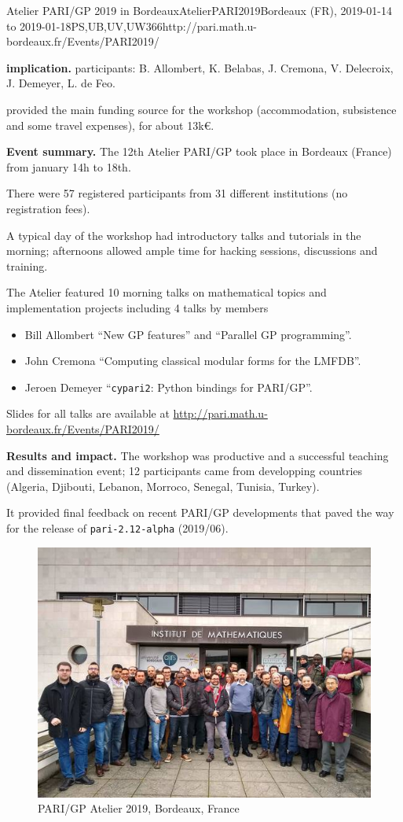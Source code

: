 \begin{event}{Atelier PARI/GP 2019 in Bordeaux}{AtelierPARI2019}{Bordeaux (FR),
2019-01-14 to 2019-01-18}{PS,UB,UV,UW}{36}{6}{http://pari.math.u-bordeaux.fr/Events/PARI2019/}


\textbf{\ODK implication.} \ODK participants: B. Allombert, K. Belabas, J.
Cremona, V. Delecroix, J.  Demeyer, L. de Feo.

\ODK provided the main funding source for the workshop (accommodation,
subsistence and some travel expenses), for about 13k\euro.

\textbf{Event summary.} The 12th Atelier PARI/GP took place in Bordeaux
(France) from january 14h to 18th.

There were 57 registered participants from 31 different institutions
(no registration fees).

A typical day of the workshop had introductory talks and tutorials
in the morning; afternoons allowed ample time for hacking sessions,
discussions and training.

The Atelier featured 10 morning talks on mathematical topics and
implementation projects including 4 talks by \ODK members
\begin{itemize}
\item Bill Allombert ``New GP features'' and ``Parallel GP programming''.
\item John Cremona ``Computing classical modular forms for the LMFDB''.
\item Jeroen Demeyer ``\texttt{cypari2}: Python bindings for PARI/GP''.
\end{itemize}

Slides for all talks are available at
\url{http://pari.math.u-bordeaux.fr/Events/PARI2019/}

\textbf{Results and impact.} The workshop was productive and a successful
teaching and dissemination event; 12 participants came from developping
countries (Algeria, Djibouti, Lebanon, Morroco, Senegal, Tunisia,
Turkey).

It provided final feedback on recent PARI/GP developments that paved the way
for the release of \texttt{pari-2.12-alpha} (2019/06).

\begin{figure}[ht]
  \includegraphics[width=.75\textwidth]{pari2019.jpg}
  \caption*{PARI/GP Atelier 2019, Bordeaux, France}
\end{figure}

\end{event}
